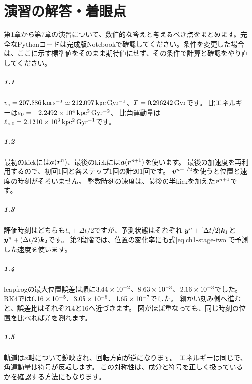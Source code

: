 \chapter{演習の解答・着眼点}
\label{chap:answers}
第1章から第7章の演習について、数値的な答えと考えるべき点をまとめます。完全なPythonコードは完成版Notebookで確認してください。条件を変更した場合は、ここに示す標準値をそのまま期待値にせず、その条件で計算と確認をやり直してください。



\paragraph{1.1}
$v_c=207.386\,\mathrm{km\,s^{-1}}\simeq212.097\,\mathrm{kpc\,Gyr^{-1}}$、$T=0.296242\,\mathrm{Gyr}$です。
比エネルギーは$\varepsilon_0=-2.2492\times 10^{4}\,\mathrm{kpc^2\,Gyr^{-2}}$、
比角運動量は$\ell_{z,0}=2.1210\times 10^{3}\,\mathrm{kpc^2\,Gyr^{-1}}$です。

\paragraph{1.2}
最初のkickには$\boldsymbol a(\boldsymbol r^n)$、最後のkickには$\boldsymbol a(\boldsymbol r^{n+1})$を使います。
最後の加速度を再利用するので、初回1回と各ステップ1回の計201回です。
$\boldsymbol v^{n+1/2}$を使うと位置と速度の時刻がそろいません。
整数時刻の速度は、最後の半kickを加えた$\boldsymbol v^{n+1}$です。

\paragraph{1.3}
評価時刻はどちらも$t_n+\Delta t/2$ですが、予測状態はそれぞれ
$\boldsymbol y^n+(\Delta t/2)\boldsymbol k_1$と$\boldsymbol y^n+(\Delta t/2)\boldsymbol k_2$です。
第2段階では、位置の変化率にも式\eqref{eq:ch1-stage-two}で予測した速度を使います。

\paragraph{1.4}
leapfrogの最大位置誤差は順に$3.44\times 10^{-2}$、$8.63\times 10^{-3}$、$2.16\times 10^{-3}$でした。
RK4では$6.16\times 10^{-5}$、$3.05\times 10^{-6}$、$1.65\times 10^{-7}$でした。
細かい刻み側へ進むと、誤差比はそれぞれ4と16へ近づきます。
図がほぼ重なっても、同じ時刻の位置を比べれば差を測れます。

\paragraph{1.5}
軌道は$x$軸について鏡映され、回転方向が逆になります。
エネルギーは同じで、角運動量は符号が反転します。
この対称性は、成分と符号を正しく扱っているかを確認する方法にもなります。

